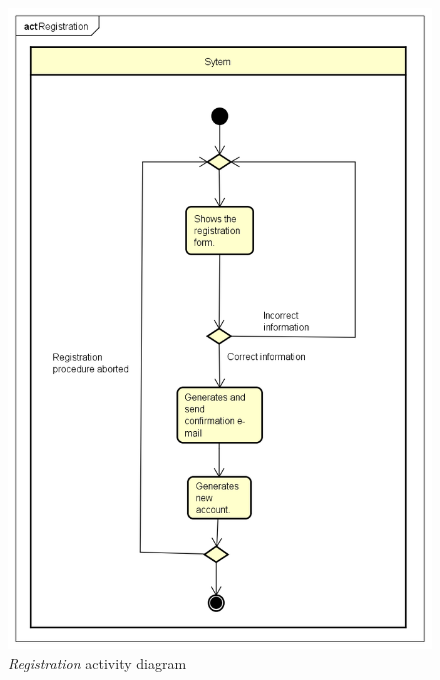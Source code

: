 \begin{figure}[h]
	\includegraphics[width=\textwidth, height=\textheight, keepaspectratio=true]{Img/RegistrationAC}
	\caption{\emph{Registration} activity diagram}
	\label{fig:registrationac}
\end{figure}

